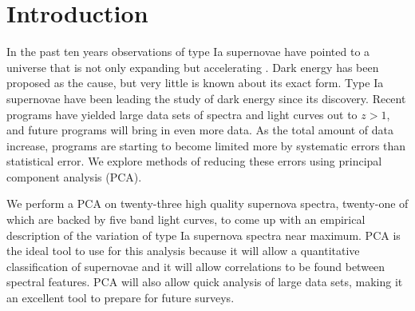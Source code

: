 \section{Introduction}

In the past ten years observations of type Ia supernovae have pointed to a universe that is not only expanding but accelerating \citep{riess98a,perlmutter99a}. Dark energy has been proposed as the cause, but very little is known about its exact form. Type Ia supernovae have been leading the study of dark energy since its discovery. Recent programs have yielded large data sets of spectra and light curves out to $z > 1$, and future programs will bring in even more data. As the total amount of data increase, programs are starting to become limited more by systematic errors than statistical error. We explore methods of reducing these errors using principal component analysis (PCA).

We perform a PCA on twenty-three high quality supernova spectra, twenty-one of which are backed by five band light curves, to come up with an empirical description of the variation of type Ia supernova spectra near maximum. PCA is the ideal tool to use for this analysis because it will allow a quantitative classification of supernovae and it will allow correlations to be found between spectral features. PCA will also allow quick analysis of large data sets, making it an excellent tool to prepare for future surveys.
